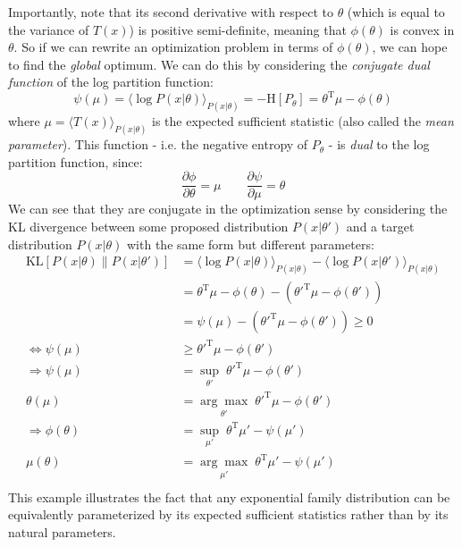 \documentclass[a4paper]{article}
\begin{document}
Importantly, note that its second derivative with respect to $\theta$ (which is equal to the variance of $T(x)$) is positive semi-definite, meaning that $\phi(\theta)$ is convex in $\theta$. So if we can rewrite an optimization problem in terms of $\phi(\theta)$, we can hope to find the \emph{global} optimum. We can do this by considering the \emph{conjugate dual function} of the log partition function: 
\[ \psi(\mu) = \langle \log P(x|\theta) \rangle_{P(x|\theta)} = -\textrm{H}[P_\theta] = \theta^\textrm{T}\mu - \phi(\theta) \]
where $\mu = \langle T(x) \rangle_{P(x|\theta)}$ is the expected sufficient statistic (also called the \emph{mean parameter}). This function - i.e. the negative entropy of $P_\theta$ - is \emph{dual} to the log partition function, since:
\[ \frac{\partial \phi}{\partial \theta} = \mu \quad\quad \frac{\partial \psi}{\partial \mu} = \theta \]
We can see that they are conjugate in the optimization sense by considering the KL divergence between some proposed distribution $P(x|\theta')$ and a target distribution $P(x|\theta)$ with the same form but different parameters:
\begin{align*}
\textrm{KL}[P(x|\theta)\|P(x|\theta')] &= \langle \log P(x|\theta) \rangle_{P(x|\theta)} - \langle \log P(x|\theta') \rangle_{P(x|\theta)} \\
&= \theta^\textrm{T}\mu - \phi(\theta) - ({\theta'}^\textrm{T}\mu - \phi(\theta')) \\
&= \psi(\mu) - ({\theta'}^\textrm{T}\mu - \phi(\theta')) \geq 0 \\
\Leftrightarrow \psi(\mu) &\geq {\theta'}^\textrm{T}\mu - \phi(\theta') \\
\Rightarrow \psi(\mu) &= \underset{\theta'}{\sup}\; {\theta'}^\textrm{T}\mu - \phi(\theta') \\
\theta(\mu) &= \underset{\theta'}{\arg\max}\; {\theta'}^\textrm{T}\mu - \phi(\theta') \\
\Rightarrow \phi(\theta) &= \underset{\mu'}{\sup}\; {\theta}^\textrm{T}\mu' - \psi(\mu') \\
\mu(\theta) &= \underset{\mu'}{\arg\max}\; {\theta}^\textrm{T}\mu' - \psi(\mu') \\
\end{align*}
This example illustrates the fact that any exponential family distribution can be equivalently parameterized by its expected sufficient statistics rather than by its natural parameters.
\end{document}
